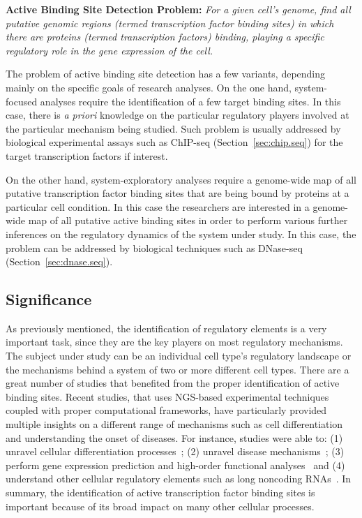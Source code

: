 \vspace{0.5cm}
\noindent
\textbf{Active Binding Site Detection Problem:} \emph{For a given cell's genome, find all putative genomic regions (termed transcription factor binding sites) in which there are proteins (termed transcription factors) binding, playing a specific regulatory role in the gene expression of the cell.}
\vspace{0.45cm}

The problem of active binding site detection has a few variants, depending mainly on the specific goals of research analyses. On the one hand, system-focused analyses require the identification of a few target binding sites. In this case, there is \emph{a priori} knowledge on the particular regulatory players involved at the particular mechanism being studied. Such problem is usually addressed by biological experimental assays such as ChIP-seq (Section~\ref{sec:chip.seq}) for the target transcription factors if interest.

On the other hand, system-exploratory analyses require a genome-wide map of all putative transcription factor binding sites that are being bound by proteins at a particular cell condition. In this case the researchers are interested in a genome-wide map of all putative active binding sites in order to perform various further inferences on the regulatory dynamics of the system under study. In this case, the problem can be addressed by biological techniques such as DNase-seq (Section~\ref{sec:dnase.seq}).

\subsection{Significance}
\label{sec:significance}

As previously mentioned, the identification of regulatory elements is a very important task, since they are the key players on most regulatory mechanisms. The subject under study can be an individual cell type's regulatory landscape or the mechanisms behind a system of two or more different cell types. There are a great number of studies that benefited from the proper identification of active binding sites. Recent studies, that uses NGS-based experimental techniques coupled with proper computational frameworks, have particularly provided multiple insights on a different range of mechanisms such as cell differentiation and understanding the onset of diseases. For instance, studies were able to: (1) unravel cellular differentiation processes~\cite{lin2015,tsankov2015}; (2) unravel disease mechanisms~\cite{schaub2012,vernot2012,charos2012}; (3) perform gene expression prediction and high-order functional analyses~\cite{yip2012,whitfield2012,natarajan2012} and (4) understand other cellular regulatory elements such as long noncoding RNAs~\cite{tilgner2012,banfai2012}. In summary, the identification of active transcription factor binding sites is important because of its broad impact on many other cellular processes.

